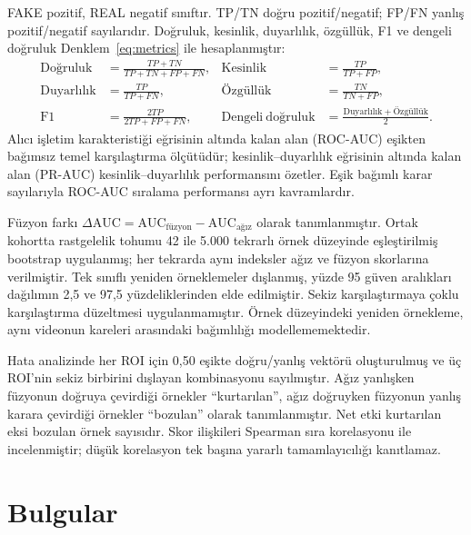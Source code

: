 \documentclass[a4paper]{elektr}
\begin{document}
FAKE pozitif, REAL negatif sınıftır. TP/TN doğru pozitif/negatif; FP/FN yanlış pozitif/negatif sayılarıdır. Doğruluk, kesinlik, duyarlılık, özgüllük, F1 ve dengeli doğruluk Denklem~\eqref{eq:metrics} ile hesaplanmıştır:
\begin{equation}\label{eq:metrics}
\begin{aligned}
\mathrm{Doğruluk}&=\frac{TP+TN}{TP+TN+FP+FN},&
\mathrm{Kesinlik}&=\frac{TP}{TP+FP},\\
\mathrm{Duyarlılık}&=\frac{TP}{TP+FN},&
\mathrm{Özgüllük}&=\frac{TN}{TN+FP},\\
\mathrm{F1}&=\frac{2TP}{2TP+FP+FN},&
\mathrm{Dengeli\ doğruluk}&=\frac{\mathrm{Duyarlılık}+\mathrm{Özgüllük}}{2}.
\end{aligned}
\end{equation}
Alıcı işletim karakteristiği eğrisinin altında kalan alan (ROC-AUC) eşikten bağımsız temel karşılaştırma ölçütüdür; kesinlik--duyarlılık eğrisinin altında kalan alan (PR-AUC) kesinlik--duyarlılık performansını özetler. Eşik bağımlı karar sayılarıyla ROC-AUC sıralama performansı ayrı kavramlardır.

Füzyon farkı $\Delta\mathrm{AUC}=\mathrm{AUC}_{\mathrm{füzyon}}-\mathrm{AUC}_{\mathrm{ağız}}$ olarak tanımlanmıştır. Ortak kohortta rastgelelik tohumu 42 ile 5.000 tekrarlı örnek düzeyinde eşleştirilmiş bootstrap uygulanmış; her tekrarda aynı indeksler ağız ve füzyon skorlarına verilmiştir. Tek sınıflı yeniden örneklemeler dışlanmış, yüzde 95 güven aralıkları dağılımın 2,5 ve 97,5 yüzdeliklerinden elde edilmiştir. Sekiz karşılaştırmaya çoklu karşılaştırma düzeltmesi uygulanmamıştır. Örnek düzeyindeki yeniden örnekleme, aynı videonun kareleri arasındaki bağımlılığı modellememektedir.

Hata analizinde her ROI için 0,50 eşikte doğru/yanlış vektörü oluşturulmuş ve üç ROI'nin sekiz birbirini dışlayan kombinasyonu sayılmıştır. Ağız yanlışken füzyonun doğruya çevirdiği örnekler ``kurtarılan'', ağız doğruyken füzyonun yanlış karara çevirdiği örnekler ``bozulan'' olarak tanımlanmıştır. Net etki kurtarılan eksi bozulan örnek sayısıdır. Skor ilişkileri Spearman sıra korelasyonu ile incelenmiştir; düşük korelasyon tek başına yararlı tamamlayıcılığı kanıtlamaz.

\section{Bulgular}
\end{document}
